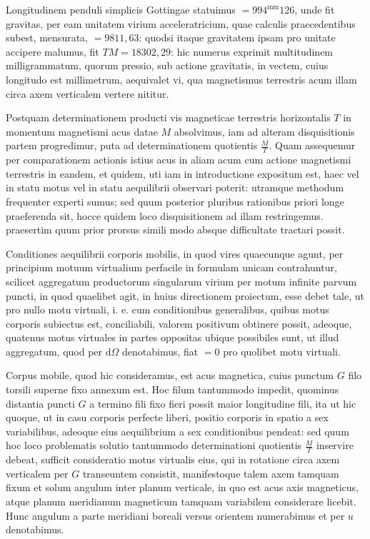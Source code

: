 Longitudinem penduli simplicis Gottingae statuimus $=994^{\mathrm{mm}}126$, unde fit gravitas, per eam unitatem virium acceleratricium, quae calculis praecedentibus subest, mensurata, $=9811{,}63$: quodsi itaque gravitatem ipsam pro unitate accipere malumus, fit $TM=18302{,}29$: hic numerus exprimit multitudinem milligrammatum, quorum pressio, sub actione gravitatis, in vectem, cuius longitudo est millimetrum, aequivalet vi, qua magnetismus terrestris acum illam circa axem verticalem vertere nititur.

Postquam determinationem producti vis magneticae terrestris horizontalis $T$ in momentum magnetismi acus datae $M$ absolvimus, iam ad alteram disquisitionis partem progredimur, puta ad determinationem quotientis $\frac MT$. Quam assequemur per comparationem actionis istius acus in aliam acum cum actione magnetismi terrestris in eandem, et quidem, uti iam in introductione expositum est, haec vel in statu motus vel in statu aequilibrii observari poterit: utramque methodum frequenter experti sumus; sed quum posterior pluribus rationibus priori longe praeferenda sit, hocce quidem loco disquisitionem ad illam restringemus. praesertim quum prior prorsus simili modo absque difficultate tractari possit.

Conditiones aequilibrii corporis mobilis, in quod vires quaecunque agunt, per principium motuum virtualium perfacile in formulam unicam contrahuntur, scilicet aggregatum productorum singularum virium per motum infinite parvum puncti, in quod quaelibet agit, in huius directionem proiectum, esse debet tale, ut pro nullo motu virtuali, i. e. cum conditionibus generalibus, quibus motus corporis subiectus est, conciliabili, valorem positivum obtinere possit, adeoque, quatenus motus virtuales in partes oppositas ubique possibiles sunt, ut illud aggregatum, quod per $\mathrm{d}\Omega$ denotabimus, fiat $=0$ pro quolibet motu virtuali.

Corpus mobile, quod hic consideramus, est acus magnetica, cuius punctum $G$ filo torsili superne fixo annexum est. Hoc filum tantummodo impedit, quominus distantia puncti $G$ a termino fili fixo fieri possit maior longitudine fili, ita ut hic quoque, ut in casu corporis perfecte liberi, positio corporis in spatio a sex variabilibus, adeoque eius aequilibrium a sex conditionibus pendeat: sed quum hoc loco problematis solutio tantummodo determinationi quotientis $\frac MT$ inservire debeat, sufficit consideratio motus virtualis eius, qui in rotatione circa axem verticalem per $G$ transeuntem consistit, manifestoque talem axem tamquam fixum et solum angulum inter planum verticale, in quo est acus axis magneticus, atque planum meridianum magneticum tamquam variabilem considerare licebit. Hunc angulum a parte meridiani boreali versus orientem numerabimus et per $u$ denotabimus.

